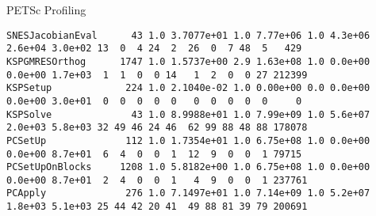 \begin{frame}[fragile]{PETSc Profiling}
{\begin{verbatim}
SNESJacobianEval      43 1.0 3.7077e+01 1.0 7.77e+06 1.0 4.3e+06 2.6e+04 3.0e+02 13  0  4 24  2  26  0  7 48  5   429
KSPGMRESOrthog      1747 1.0 1.5737e+00 2.9 1.63e+08 1.0 0.0e+00 0.0e+00 1.7e+03  1  1  0  0 14   1  2  0  0 27 212399
KSPSetup             224 1.0 2.1040e-02 1.0 0.00e+00 0.0 0.0e+00 0.0e+00 3.0e+01  0  0  0  0  0   0  0  0  0  0     0
KSPSolve              43 1.0 8.9988e+01 1.0 7.99e+09 1.0 5.6e+07 2.0e+03 5.8e+03 32 49 46 24 46  62 99 88 48 88 178078
PCSetUp              112 1.0 1.7354e+01 1.0 6.75e+08 1.0 0.0e+00 0.0e+00 8.7e+01  6  4  0  0  1  12  9  0  0  1 79715
PCSetUpOnBlocks     1208 1.0 5.8182e+00 1.0 6.75e+08 1.0 0.0e+00 0.0e+00 8.7e+01  2  4  0  0  1   4  9  0  0  1 237761
PCApply              276 1.0 7.1497e+01 1.0 7.14e+09 1.0 5.2e+07 1.8e+03 5.1e+03 25 44 42 20 41  49 88 81 39 79 200691
\end{verbatim}
}
\end{frame}
